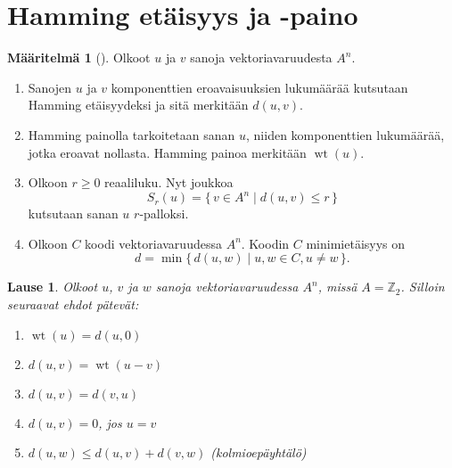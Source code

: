 \documentclass[a4paper,12pt,leqno,oneside]{report} %
\theoremstyle{plain}
\newtheorem{lause}{Lause}[chapter]
\theoremstyle{definition}
\newtheorem{maaritelma}{Määritelmä}[chapter]
\DeclareMathOperator{\wt}{wt}
\theoremstyle{remark}
\numberwithin{equation}{chapter}
\newcommand*{\Zset}{\mathbb{Z}}  %
\begin{document}
    \section{Hamming etäisyys ja -paino}
    \begin{maaritelma}[{\cite[s.~492]{PA}}]\label{maar:perus}
        Olkoot $u$ ja $v$ sanoja vektoriavaruudesta $A^n$.
        \begin{enumerate}
            \item\label{kht:etaisyys} Sanojen $u$ ja $v$ komponenttien eroavaisuuksien lukumäärää kutsutaan Hamming etäisyydeksi ja sitä merkitään $d(u,v)$.
            \item\label{kht:paino} Hamming painolla tarkoitetaan sanan $u$, niiden komponenttien lukumäärää, jotka eroavat nollasta. Hamming painoa merkitään 
                $\wt(u)$.
            \item Olkoon $r\ge0$ reaaliluku. Nyt joukkoa
                \[
                    S_r(u) = \{\,v \in A^n \mid d(u, v) \le r \,\}
                \]
                kutsutaan sanan $u$ $r$-palloksi.
            \item Olkoon $C$ koodi vektoriavaruudessa $A^n$. Koodin $C$ minimietäisyys on
                \[
                    d = \min\{\, d(u, w) \mid u, w \in C, u \neq w \,\}.
                \]
        \end{enumerate}
    \end{maaritelma}

    \begin{lause}\label{lause:Hamming}
        Olkoot $u$, $v$ ja $w$ sanoja vektoriavaruudessa $A^n$, missä $A = \Zset_2$. Silloin seuraavat ehdot pätevät:
        \begin{enumerate}
            \item\label{kht:painoetaisyys} $\wt(u) = d(u, 0)$
            \item\label{kht:etaisyyspaino} $d(u, v) = \wt(u - v)$
            \item\label{kht:vaihdannaisuus}$d(u, v) = d(v, u)$
            \item\label{kht:nollaetaisyys} $d(u, v) = 0$, jos $u = v$
            \item\label{kht:kolmioey} $d(u, w) \le d(u, v) + d(v, w)$ \quad (kolmioepäyhtälö)
        \end{enumerate}
    \end{lause}
\end{document}
